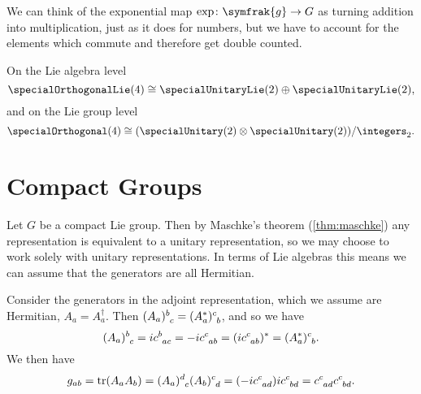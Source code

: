 \documentclass[fleqn]{NotesClass}
\newcommand{\cyclicGroupZ}[1][n]{\integers_{#1}}
\renewcommand{\lie}[1]{\symfrak{#1}}
\newcommand{\isomorphic}{\cong}
\newcommand{\hermit}{\dagger}
\DeclareMathOperator{\tr}{tr}
\begin{document}
    We can think of the exponential map \(\exp \colon \lie{g} \to G\) as turning addition into multiplication, just as it does for numbers, but we have to account for the elements which commute and therefore get double counted.
    
    \begin{exm}{}{}
        On the Lie algebra level
        \begin{equation}
            \specialOrthogonalLie(4) \isomorphic \specialUnitaryLie(2) \oplus \specialUnitaryLie(2),
        \end{equation}
        and on the Lie group level
        \begin{equation}
            \specialOrthogonal(4) \isomorphic (\specialUnitary(2) \otimes \specialUnitary(2)) / \cyclicGroupZ[2].
        \end{equation}
    \end{exm}
    
    \section{Compact Groups}
    Let \(G\) be a compact Lie group.
    Then by Maschke's theorem (\cref{thm:maschke}) any representation is equivalent to a unitary representation, so we may choose to work solely with unitary representations.
    In terms of Lie algebras this means we can assume that the generators are all Hermitian.
    
    Consider the generators in the adjoint representation, which we assume are Hermitian, \(A_a = A_a^\hermit\).
    Then \(\tensor{(A_a)}{^b_c} = \tensor{(A_a^*)}{^c_b}\), and so we have
    \begin{equation}
        \tensor{(A_a)}{^b_c} = i\tensor{c}{^b_{ac}} = -i\tensor{c}{^c_{ab}} = (i\tensor{c}{^c_{ab}})^* = \tensor{(A_a^*)}{^c_b}.
    \end{equation}
    We then have
    \begin{equation}
        g_{ab} = \tr(A_a A_b) = \tensor{(A_a)}{^d_c} \tensor{(A_b)}{^c_d} = (-i\tensor{c}{^c_{ad}}) i\tensor{c}{^c_{bd}} = \tensor{c}{^c_{ad}} \tensor{c}{^c_{bd}}.
    \end{equation}
    
\end{document}
